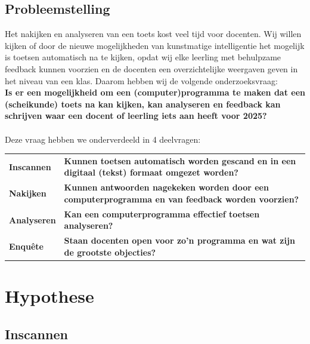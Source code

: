 \documentclass[12pt]{article}
\begin{document}
\begin{multicols}{2}
\subsection{Probleemstelling}
Het nakijken en analyseren van een toets kost veel tijd voor docenten. Wij willen kijken of door de nieuwe mogelijkheden van kunstmatige intelligentie het mogelijk is toetsen automatisch na te kijken, opdat wij elke leerling met behulpzame feedback kunnen voorzien en de docenten een overzichtelijke weergaven geven in het niveau van een klas.
Daarom hebben wij de volgende onderzoeksvraag: \\ %
\textbf{Is er een mogelijkheid om een (computer)programma te maken dat een (scheikunde) toets na kan kijken, kan analyseren en feedback kan schrijven waar een docent of leerling iets aan heeft voor 2025?}
\\\\
Deze vraag hebben we onderverdeeld in 4 deelvragen:\\
\begin{tabularx}{\linewidth}{@{}lX}
    \vspace{0.2cm}
   \textbf{Inscannen } & \textbf{Kunnen toetsen automatisch worden gescand en in een digitaal (tekst) formaat omgezet worden?} \\
   \vspace{0.2cm}
   \textbf{Nakijken } & \textbf{Kunnen antwoorden nagekeken worden door een computerprogramma en van feedback worden voorzien?} \\
   \vspace{0.2cm}
   \textbf{Analyseren } & \textbf{Kan een computerprogramma effectief toetsen analyseren?} \\
   \vspace{0.2cm}
   \textbf{Enquête } & \textbf{Staan docenten open voor zo'n programma en wat zijn de grootste objecties? } \\
\end{tabularx}

\end{multicols}
\pagebreak

\section{Hypothese}
\subsection{Inscannen}
\end{document}
